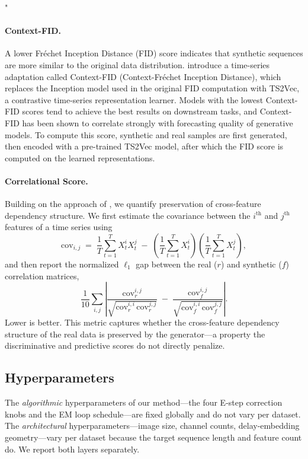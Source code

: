 "\documentclass{article}
\theoremstyle{plain}
\theoremstyle{definition}
\theoremstyle{remark}
\begin{document}
\paragraph{Context-FID.}
A lower Fr\'echet Inception Distance (FID) score indicates that synthetic sequences are more similar to the original data distribution. \citet{yue2022ts2vec} introduce a time-series adaptation called Context-FID (Context-Fr\'echet Inception Distance), which replaces the Inception model used in the original FID computation with TS2Vec, a contrastive time-series representation learner. Models with the lowest Context-FID scores tend to achieve the best results on downstream tasks, and Context-FID has been shown to correlate strongly with forecasting quality of generative models. To compute this score, synthetic and real samples are first generated, then encoded with a pre-trained TS2Vec model, after which the FID score is computed on the learned representations.

\paragraph{Correlational Score.}
Building on the approach of \citet{liao2020conditional}, we quantify preservation of cross-feature dependency structure. We first estimate the covariance between the $i^{\mathrm{th}}$ and $j^{\mathrm{th}}$ features of a time series using
\[
\mathrm{cov}_{i,j} \;=\; \frac{1}{T} \sum_{t=1}^{T} X_t^{i} X_t^{j} \;-\; \left( \frac{1}{T} \sum_{t=1}^{T} X_t^{i} \right) \left( \frac{1}{T} \sum_{t=1}^{T} X_t^{j} \right),
\]
and then report the normalized $\ell_1$ gap between the real ($r$) and synthetic ($f$) correlation matrices,
\[
\frac{1}{10} \sum_{i,j} \left| \frac{\mathrm{cov}_r^{i,j}}{\sqrt{\mathrm{cov}_r^{i,i} \, \mathrm{cov}_r^{j,j}}} \;-\; \frac{\mathrm{cov}_f^{i,j}}{\sqrt{\mathrm{cov}_f^{i,i} \, \mathrm{cov}_f^{j,j}}} \right|.
\]
Lower is better. This metric captures whether the cross-feature dependency structure of the real data is preserved by the generator---a property the discriminative and predictive scores do not directly penalize.

\subsection{Hyperparameters}
\label{app:hyperparams}

The \emph{algorithmic} hyperparameters of our method---the four E-step correction knobs and the EM loop schedule---are fixed globally and do not vary per dataset. The \emph{architectural} hyperparameters---image size, channel counts, delay-embedding geometry---vary per dataset because the target sequence length and feature count do. We report both layers separately.
\end{document}
